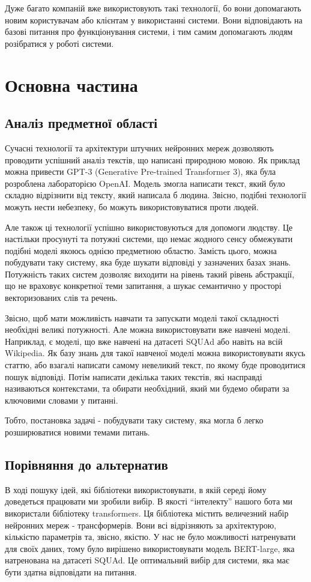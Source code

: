 \documentclass[a4paper,14pt]{extreport}
\newcommand\chap[1]{%
  \chapter*{#1}%
  \addcontentsline{toc}{chapter}{\uppercase{#1}}}
\begin{document}
    Дуже багато компаній вже використовують такі технології, бо вони допомагають новим користувачам або клієнтам у використанні системи. Вони відповідають на базові питання про функціонування системи, і тим самим допомагають людям розібратися у роботі системи. 

\chap{Основна частина}
\section{Аналіз предметної області}
    Сучасні технології та архітектури штучних нейронних мереж дозволяють проводити успішний аналіз текстів, що написані природною мовою. Як приклад можна привести GPT-3 (Generative Pre-trained Transformer 3), яка була розроблена лабораторією OpenAI. Модель змогла написати текст, який було складно відрізнити від тексту, який написала б людина. Звісно, подібні технології можуть нести небезпеку, бо можуть використовуватися проти людей.

    Але також ці технології успішно використовуються для допомоги людству. Це настільки просунуті та потужні системи, що немає жодного сенсу обмежувати подібні моделі якоюсь однією предметною областю. Замість цього, можна побудувати таку систему, яка буде шукати відповіді у зазначених базах знань. Потужність таких систем дозволяє виходити на рівень такий рівень абстракції, що не враховує конкретної теми запитання, а шукає семантично у просторі векторизованих слів та речень.

    Звісно, щоб мати можливість навчати та запускати моделі такої складності необхідні великі потужності. Але можна використовувати вже навчені моделі. Наприклад, є моделі, що вже навчені на датасеті SQUAd або навіть на всій Wikipedia. Як базу знань для такої навченої моделі можна використовувати якусь статтю, або взагалі написати самому невеликий текст, по якому буде проводитися пошук відповіді. Потім написати декілька таких текстів, які насправді називаються контекстами, та обирати необхідний, який ми будемо обирати за ключовими словами у питанні.

    Тобто, постановка задачі - побудувати таку систему, яка могла б легко розширюватися новими темами питань.

\section{Порівняння до альтернатив}
    В ході пошуку ідей, які бібліотеки використовувати, в якій середі йому доведеться працювати ми зробили вибір. В якості ``інтелекту'' нашого бота ми використали бібліотеку transformers. Ця бібліотека містить величезний набір нейронних мереж - трансформерів. Вони всі відрізняють за архітектурою, кількістю параметрів та, звісно, якістю. У нас не було можливості натренувати для своїх даних, тому було вирішено використовувати модель BERT-large, яка натренована на датасеті SQUAd. Це оптимальний вибір для системи, яка має бути здатна відповідати на питання.
\end{document}
